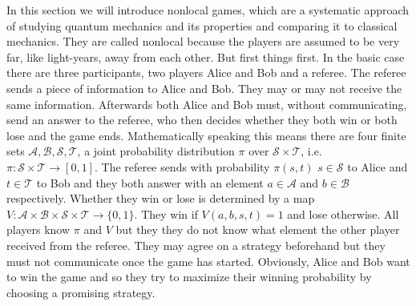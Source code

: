 In this section we will introduce nonlocal games, which are a systematic approach of studying quantum mechanics and its properties and comparing it to classical mechanics. They are called nonlocal because the players are assumed to be very far, like light-years, away from each other. But first things first. In the basic case there are three participants, two players Alice and Bob and a referee. The referee sends a piece of information to Alice and Bob. They may or may not receive the same information. Afterwards both Alice and Bob must, without communicating, send an answer to the referee, who then decides whether they both win or both lose and the game ends. Mathematically speaking this means there are four finite sets $\mathcal{A}, \mathcal{B}, \mathcal{S}, \mathcal{T}$, a joint probability distribution $\pi$ over $\mathcal{S} \times \mathcal{T}$, i.e. $\pi : \mathcal{S} \times \mathcal{T} \rightarrow [0,1]$. The referee sends with probability $\pi(s,t)$ $s \in \mathcal{S}$ to Alice and $t \in \mathcal{T}$ to Bob and they both answer with an element $a \in \mathcal{A}$ and $b \in \mathcal{B}$ respectively. Whether they win or lose is determined by a map $V : \mathcal{A} \times \mathcal{B} \times \mathcal{S} \times \mathcal{T} \rightarrow \{ 0 , 1 \}$. They win if $V(a,b,s,t)=1$ and lose otherwise. All players know $\pi$ and $V$ but they they do not know what element the other player received from the referee. They may agree on a strategy beforehand but they must not communicate once the game has started. Obviously, Alice and Bob want to win the game and so they try to maximize their winning probability by choosing a promising strategy.
